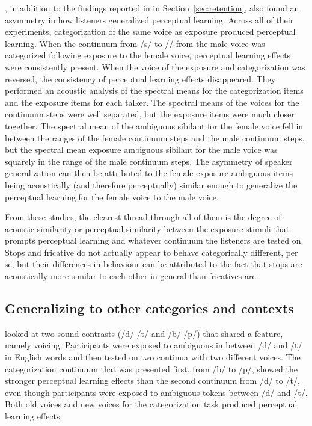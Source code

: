 \citet{Kraljic2005}, in addition to the findings reported in in Section~\ref{sec:retention}, also found an asymmetry in how listeners generalized perceptual learning.  
Across all of their experiments, categorization of the same voice as exposure produced perceptual learning.  
When the continuum from /s/ to /\textesh/ from the male voice was categorized following exposure to the female voice, perceptual learning effects were consistently present.
When the voice of the exposure and categorization was reversed, the consistency of perceptual learning effects disappeared. 
They performed an acoustic analysis of the spectral means for the categorization items and the exposure items for each talker.  The spectral means of the voices for the continuum steps were well separated, but the exposure items were much closer together.  The spectral mean of the ambiguous sibilant for the female voice fell in between the ranges of the female continuum steps and the male continuum steps, but the spectral mean exposure ambiguous sibilant for the male voice was squarely in the range of the male continuum steps.  The asymmetry of speaker generalization can then be attributed to the female exposure ambiguous items being acoustically (and therefore perceptually) similar enough to generalize the perceptual learning for the female voice to the male voice.

From these studies, the clearest thread through all of them is the degree of acoustic similarity or perceptual similarity between the exposure stimuli that prompts perceptual learning and whatever continuum the listeners are tested on.  
Stops and fricative do not actually appear to behave categorically different, per se, but their differences in behaviour can be attributed to the fact that stops are acoustically more similar to each other in general than fricatives are.

\subsection{Generalizing to other categories and contexts}

\citet{Kraljic2006} looked at two sound contrasts (/d/-/t/ and /b/-/p/) that shared a feature, namely voicing.  
Participants were exposed to ambiguous in between /d/ and /t/ in English words and then tested on two continua with two different voices.  
The categorization continuum that was presented first, from /b/ to /p/, showed the stronger perceptual learning effects than the second continuum from /d/ to /t/, even though participants were exposed to ambiguous tokens between /d/ and /t/. 
 Both old voices and new voices for the categorization task produced perceptual learning effects.

